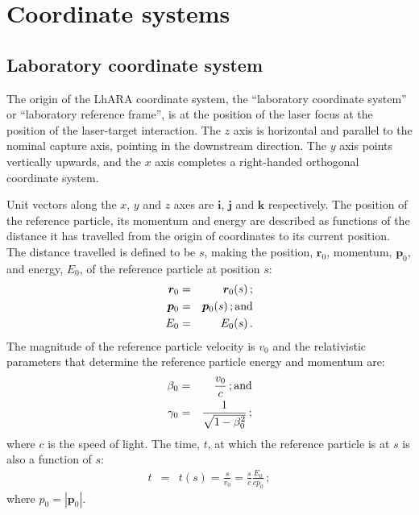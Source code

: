 \graphicspath{ {02-CoordinateSystems/Figures/} }

\section{Coordinate systems}

\subsection{Laboratory coordinate system}

The origin of the LhARA coordinate system, the ``laboratory coordinate
system'' or ``laboratory reference frame'', is at the position of the
laser focus at the position of the laser-target interaction.
The $z$ axis is horizontal and parallel to the nominal capture axis,
pointing in the downstream direction.
The $y$ axis points vertically upwards, and the $x$ axis completes a
right-handed orthogonal coordinate system. 

Unit vectors along the $x$, $y$ and $z$ axes are $\bm{i}$, $\bm{j}$
and $\bm{k}$ respectively.
The position of the reference particle, its momentum and energy are
described as functions of the distance it has travelled from the origin
of coordinates to its current position.
The distance travelled is defined to be $s$, making the position,
$\bm{r}_0$, momentum, $\bm{p}_0$, and energy, $E_0$, of the
reference particle at position $s$:
\begin{eqnarray}
  \bm{r}_0 & = & \bm{r}_0(s)\, ;           \nonumber \\
  \bm{p}_0 & = & \bm{p}_0(s)\, {\rm ; and}           \\
       E_0 & = &      E_0(s)\, .           \nonumber
\end{eqnarray}
The magnitude of the reference particle velocity is $v_0$ and the
relativistic parameters that determine the reference particle energy
and momentum are:
\begin{eqnarray}
  \beta_0  & = & \frac{v_0}{c}                  \, {\rm ; and} \nonumber \\
  \gamma_0 & = & \frac{1}{\sqrt{1 - \beta^2_0}} \,; \nonumber
\end{eqnarray}
where $c$ is the speed of light.
The time, $t$, at which the reference particle is at $s$ is also a
function of $s$:
\begin{eqnarray}
        t  & = & t(s) = \frac{s}{v_0} = \frac{s}{c} \frac{E_0}{c p_0}\, ;
\end{eqnarray}
where $p_0=\left|\bm{p}_0\right|$.

